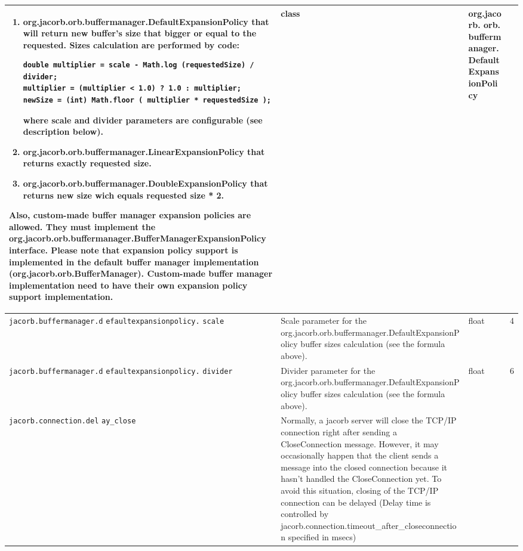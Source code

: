 \begin{small}
\begin{longtable}{|p{5cm}|p{7.5cm}|p{1.5cm}|p{1.5cm}|}
\begin{enumerate}
\item org.jacorb.orb.buffermanager.DefaultExpansionPolicy that will
    return new buffer's size that bigger or equal to the requested.
    Sizes calculation are performed by code:
\begin{tiny}
\begin{verbatim}
double multiplier = scale - Math.log (requestedSize) / divider;
multiplier = (multiplier < 1.0) ? 1.0 : multiplier;
newSize = (int) Math.floor ( multiplier * requestedSize );
\end{verbatim}
\end{tiny}
     where scale and divider parameters are configurable (see description
     below).
\item org.jacorb.orb.buffermanager.LinearExpansionPolicy that returns exactly
     requested size.
\item org.jacorb.orb.buffermanager.DoubleExpansionPolicy that returns new
     size wich equals requested size * 2.
\end{enumerate}
Also, custom-made buffer manager expansion policies are allowed. They must
implement the org.jacorb.orb.buffermanager.BufferManagerExpansionPolicy
interface. Please note that expansion policy support is implemented in the
default buffer manager implementation (org.jacorb.orb.BufferManager).
Custom-made buffer manager implementation need to have their own expansion
policy support implementation.
& class & org.jacorb.
orb.
buffermanager.
DefaultExpansionPolicy \\
\hline
\verb"jacorb.buffermanager.d"
\verb"efaultexpansionpolicy."
\verb"scale" & Scale parameter for the org.jacorb.orb.buffermanager.DefaultExpansionPolicy
buffer sizes calculation (see the formula above).
 & float & 4 \\
\hline
\verb"jacorb.buffermanager.d"
\verb"efaultexpansionpolicy."
\verb"divider" & Divider parameter for the org.jacorb.orb.buffermanager.DefaultExpansionPolicy
buffer sizes calculation (see the formula above).
 & float & 6 \\
\hline
\verb"jacorb.connection.del"
\verb"ay_close" & Normally, a jacorb server will close the TCP/IP connection
right after sending a CloseConnection message. However, it may occasionally
happen that the client sends a message into the closed connection because
it hasn't handled the CloseConnection yet. To avoid this situation, closing
of the TCP/IP connection can be delayed (Delay time is controlled by
jacorb.connection.timeout\_after\_closeconnection specified in msecs) &

\end{longtable}
\end{small}
